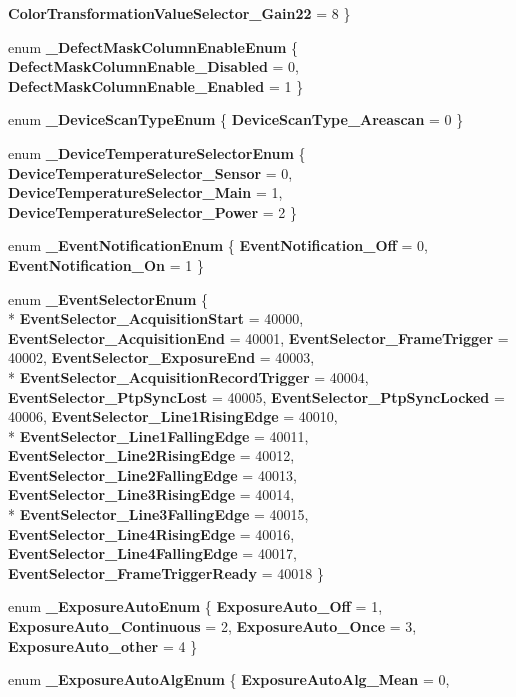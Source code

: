 \begin{DoxyCompactItemize}
{\bfseries Color\-Transformation\-Value\-Selector\-\_\-\-Gain22} = 8
 \}
\item 
enum {\bfseries \-\_\-\-Defect\-Mask\-Column\-Enable\-Enum} \{ {\bfseries Defect\-Mask\-Column\-Enable\-\_\-\-Disabled} = 0, 
{\bfseries Defect\-Mask\-Column\-Enable\-\_\-\-Enabled} = 1
 \}
\item 
enum {\bfseries \-\_\-\-Device\-Scan\-Type\-Enum} \{ {\bfseries Device\-Scan\-Type\-\_\-\-Areascan} = 0
 \}
\item 
enum {\bfseries \-\_\-\-Device\-Temperature\-Selector\-Enum} \{ {\bfseries Device\-Temperature\-Selector\-\_\-\-Sensor} = 0, 
{\bfseries Device\-Temperature\-Selector\-\_\-\-Main} = 1, 
{\bfseries Device\-Temperature\-Selector\-\_\-\-Power} = 2
 \}
\item 
enum {\bfseries \-\_\-\-Event\-Notification\-Enum} \{ {\bfseries Event\-Notification\-\_\-\-Off} = 0, 
{\bfseries Event\-Notification\-\_\-\-On} = 1
 \}
\item 
enum {\bfseries \-\_\-\-Event\-Selector\-Enum} \{ \\*
{\bfseries Event\-Selector\-\_\-\-Acquisition\-Start} = 40000, 
{\bfseries Event\-Selector\-\_\-\-Acquisition\-End} = 40001, 
{\bfseries Event\-Selector\-\_\-\-Frame\-Trigger} = 40002, 
{\bfseries Event\-Selector\-\_\-\-Exposure\-End} = 40003, 
\\*
{\bfseries Event\-Selector\-\_\-\-Acquisition\-Record\-Trigger} = 40004, 
{\bfseries Event\-Selector\-\_\-\-Ptp\-Sync\-Lost} = 40005, 
{\bfseries Event\-Selector\-\_\-\-Ptp\-Sync\-Locked} = 40006, 
{\bfseries Event\-Selector\-\_\-\-Line1\-Rising\-Edge} = 40010, 
\\*
{\bfseries Event\-Selector\-\_\-\-Line1\-Falling\-Edge} = 40011, 
{\bfseries Event\-Selector\-\_\-\-Line2\-Rising\-Edge} = 40012, 
{\bfseries Event\-Selector\-\_\-\-Line2\-Falling\-Edge} = 40013, 
{\bfseries Event\-Selector\-\_\-\-Line3\-Rising\-Edge} = 40014, 
\\*
{\bfseries Event\-Selector\-\_\-\-Line3\-Falling\-Edge} = 40015, 
{\bfseries Event\-Selector\-\_\-\-Line4\-Rising\-Edge} = 40016, 
{\bfseries Event\-Selector\-\_\-\-Line4\-Falling\-Edge} = 40017, 
{\bfseries Event\-Selector\-\_\-\-Frame\-Trigger\-Ready} = 40018
 \}
\item 
enum {\bfseries \-\_\-\-Exposure\-Auto\-Enum} \{ {\bfseries Exposure\-Auto\-\_\-\-Off} = 1, 
{\bfseries Exposure\-Auto\-\_\-\-Continuous} = 2, 
{\bfseries Exposure\-Auto\-\_\-\-Once} = 3, 
{\bfseries Exposure\-Auto\-\_\-other} = 4
 \}
\item 
enum {\bfseries \-\_\-\-Exposure\-Auto\-Alg\-Enum} \{ {\bfseries Exposure\-Auto\-Alg\-\_\-\-Mean} = 0, 

\end{DoxyCompactItemize}
